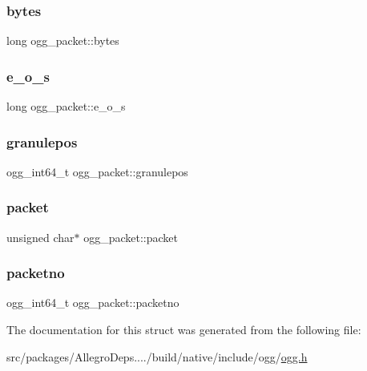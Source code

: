 \subsubsection{\texorpdfstring{bytes}{bytes}}
{\footnotesize\ttfamily long ogg\+\_\+packet\+::bytes}

\mbox{\label{structogg__packet_aa367e7c5425c5f65cbd126b82dfc72e8}} 
\subsubsection{\texorpdfstring{e\+\_\+o\+\_\+s}{e\_o\_s}}
{\footnotesize\ttfamily long ogg\+\_\+packet\+::e\+\_\+o\+\_\+s}

\mbox{\label{structogg__packet_a838d9a000e08bae982409bc2734fc566}} 
\subsubsection{\texorpdfstring{granulepos}{granulepos}}
{\footnotesize\ttfamily ogg\+\_\+int64\+\_\+t ogg\+\_\+packet\+::granulepos}

\mbox{\label{structogg__packet_a57e7096985ec8766dce415e248767c32}} 
\subsubsection{\texorpdfstring{packet}{packet}}
{\footnotesize\ttfamily unsigned char$\ast$ ogg\+\_\+packet\+::packet}

\mbox{\label{structogg__packet_a60e257b3a8f843135474457197c65a45}} 
\subsubsection{\texorpdfstring{packetno}{packetno}}
{\footnotesize\ttfamily ogg\+\_\+int64\+\_\+t ogg\+\_\+packet\+::packetno}



The documentation for this struct was generated from the following file\+:\begin{DoxyCompactItemize}
\item 
src/packages/\+Allegro\+Deps..../build/native/include/ogg/\hyperlink{ogg_8h}{ogg.\+h}\end{DoxyCompactItemize}
